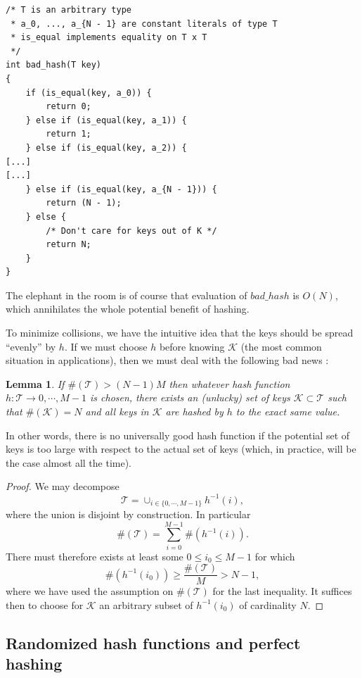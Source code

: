\documentclass[12pt]{article}
\theoremstyle{plain}
\newtheorem{lemma}{Lemma}
\theoremstyle{remark}
\begin{document}
\begin{lstlisting}[style=C]
/* T is an arbitrary type
 * a_0, ..., a_{N - 1} are constant literals of type T
 * is_equal implements equality on T x T 
 */
int bad_hash(T key)
{
	if (is_equal(key, a_0)) {
		return 0;
	} else if (is_equal(key, a_1)) {
		return 1;
	} else if (is_equal(key, a_2)) {
[...]
[...]
	} else if (is_equal(key, a_{N - 1})) {
		return (N - 1);
	} else {
		/* Don't care for keys out of K */
		return N;
	}
}
\end{lstlisting}

The elephant in the room is of course that evaluation of $bad\_hash$ is $O(N)$,
which annihilates the whole potential benefit of hashing.

\medskip
To minimize collisions, we have the intuitive idea that the keys should be
spread ``evenly'' by $h$. If we must choose $h$ before knowing $\mathcal{K}$
(the most common situation in applications), then we must deal with the following
bad news :

\begin{lemma} If $\#(\mathcal{T}) > (N-1)M$ then whatever hash function $h
	:\mathcal{T} \to {0, \cdots, M-1}$ is chosen, there exists an (unlucky)
	set of keys $\mathcal{K} \subset \mathcal{T}$ such that $\#(\mathcal{K})
	= N$ and all keys in $\mathcal{K}$ are hashed by $h$ to the exact same
	value.
\end{lemma}

In other words, there is no universally good hash function if the potential set 
of keys is too large with respect to the actual set of keys (which, in practice, 
will be the case almost all the time).

\begin{proof}
We may decompose
$$
	\mathcal{T} = \cup_{i \in \{0,\cdots, M-1\}} h^{-1}(i),
$$
where the union is disjoint by construction. In particular
$$
	\#(\mathcal{T}) = \sum_{i=0}^{M-1} \#(h^{-1}(i)).
$$
There must therefore exists at least some $0 \leq i_0 \leq M-1$ for
which
$$
	\#(h^{-1}(i_0)) \geq \frac{\#(\mathcal{T})}{M} > N - 1,
$$
	where we have used the assumption on $\#(\mathcal{T})$ for the last
	inequality. It suffices then to choose for $\mathcal{K}$ an arbitrary
	subset of $h^{-1}(i_0)$ of cardinality $N$.
\end{proof}

\subsection{Randomized hash functions and perfect hashing}
\end{document}
